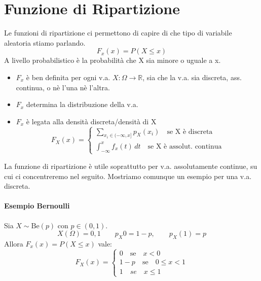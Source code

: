 \section{Funzione di Ripartizione}
Le funzioni di ripartizione ci permettono di capire di che tipo di variabile aleatoria
stiamo parlando.
\begin{equation*}
	F_x (x) = P(X \leq x)
\end{equation*}
A livello probabilistico è la probabilità che X sia minore o uguale a x.
\begin{itemize}
	\item $F_x$ è ben definita per ogni v.a. $X: \Omega \rightarrow \mathbb{R}$, sia che la v.a.
	      sia discreta, ass. continua, o nè l'una nè l'altra.
	\item $F_x$ determina la distribuzione della v.a.
	\item $F_x$ è legata alla densità discreta/densità di X
	      \begin{equation*}
		      F_X(x) =
		      \begin{cases}
			      \sum_{x_i \in (- \infty, x]} p_X (x_i) \quad \text{se X è discreta} \\
			      \int_{-\infty}^{x} f_x(t)\,dt \quad \text{se X è assolut. continua}
		      \end{cases}
	      \end{equation*}
\end{itemize}
La funzione di ripartizione è utile soprattutto per v.a. assolutamente continue, su cui
ci concentreremo nel seguito. Mostriamo comunque un esempio per una v.a. discreta.
\paragraph*{Esempio Bernoulli} Sia $X \sim \text{Be}(p)$ con $p \in (0,1)$.
\begin{equation*}
	X(\Omega) = {0, 1} \qquad p_X{0}=1-p, \qquad p_X(1) = p
\end{equation*}
Allora $F_x(x) = P(X \leq x)$ vale:
\begin{equation*}
	F_X(x) =
	\begin{cases}
		0 \quad \text{se} \quad x < 0          \\
		1-p \quad \text{se} \quad 0 \leq x < 1 \\
		1 \quad se \quad x \leq 1
	\end{cases}
\end{equation*}

